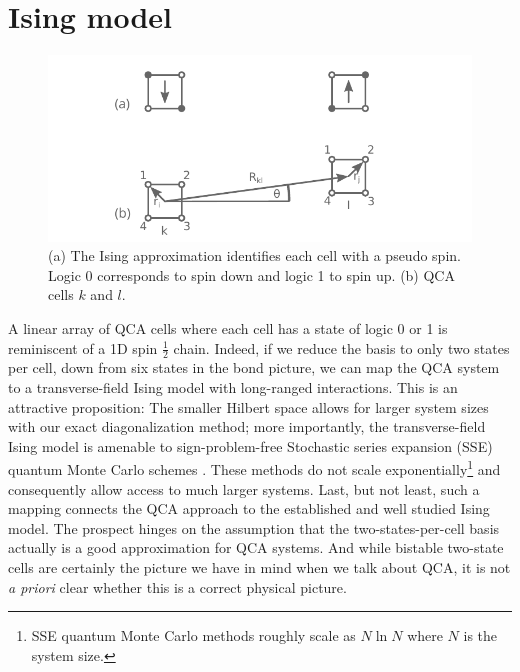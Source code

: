 \section{Ising model}

%
\begin{figure}
  \center
  \includegraphics{ising}
  \caption{
  (a) The Ising approximation identifies each cell with a pseudo spin. Logic 0
  corresponds to spin down and logic 1 to spin up. (b) QCA cells $k$ and $l$. 
  }
  \label{fig:ising}
\end{figure}
%
A linear array of QCA cells where each cell has a state of logic 0 or 1 is
reminiscent of a 1D spin $\frac{1}{2}$ chain. Indeed, if we reduce the basis to
only two states per cell, down from six states in the bond picture, we
can map the QCA system to a transverse-field Ising model with long-ranged
interactions. This is an attractive proposition: The smaller Hilbert space
allows for larger system sizes with our exact diagonalization method; more
importantly, the transverse-field Ising model is amenable to sign-problem-free
Stochastic series expansion (SSE) quantum Monte Carlo schemes
\cite{Sandvik2003}. These methods do not scale exponentially\footnote{SSE
quantum Monte Carlo methods roughly scale as $N \ln N$ where $N$ is the system
size.} and consequently allow access to much larger systems. Last, but not
least, such a mapping connects the QCA approach to the established and well
studied Ising model. The prospect hinges on the assumption that the
two-states-per-cell basis actually is a good approximation for QCA systems. And
while bistable two-state cells are certainly the picture we have in mind when we
talk about QCA, it is not \emph{a priori} clear whether this is a correct
physical picture. 


